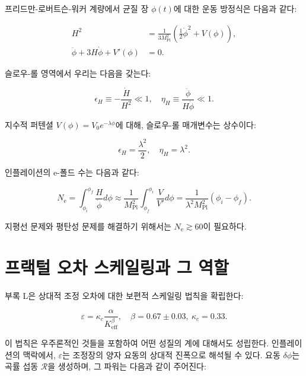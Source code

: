 \documentclass[11pt,a4paper]{article}
\newcommand{\eps}{\varepsilon}
\newcommand{\kappac}{\kappa_c}
\newcommand{\Keff}{K_{\mathrm{eff}}}
\newcommand{\Mpl}{M_{\mathrm{Pl}}}
\newcommand{\ninf}{N_{\mathrm{e}}}
\begin{document}
	프리드만-로버트슨-워커 계량에서 균질 장 \(\phi(t)\)에 대한 운동 방정식은 다음과 같다:
	
	\begin{align}
		H^2 &= \frac{1}{3\Mpl^2} \left( \frac{1}{2}\dot{\phi}^2 + V(\phi) \right), \label{eq:friedman1} \\
		\ddot{\phi} + 3H\dot{\phi} + V'(\phi) &= 0. \label{eq:field}
	\end{align}
	
	슬로우-롤 영역에서 우리는 다음을 갖는다:
	
	\begin{equation}
		\epsilon_H \equiv -\frac{\dot{H}}{H^2} \ll 1, \quad \eta_H \equiv \frac{\ddot{\phi}}{H\dot{\phi}} \ll 1.
	\end{equation}
	
	지수적 퍼텐셜 \(V(\phi) = V_0 e^{-\lambda \phi}\)에 대해, 슬로우-롤 매개변수는 상수이다:
	
	\begin{equation}
		\epsilon_H = \frac{\lambda^2}{2}, \quad \eta_H = \lambda^2.
		\label{eq:slowroll}
	\end{equation}
	
	인플레이션의 e-폴드 수는 다음과 같다:
	
	\begin{equation}
		\ninf = \int_{\phi_i}^{\phi_f} \frac{H}{\dot{\phi}} d\phi \approx \frac{1}{\Mpl^2} \int_{\phi_f}^{\phi_i} \frac{V}{V'} d\phi = \frac{1}{\lambda^2 \Mpl^2} (\phi_i - \phi_f).
	\end{equation}
	
	지평선 문제와 평탄성 문제를 해결하기 위해서는 \(\ninf \gtrsim 60\)이 필요하다.
	
	\section{프랙털 오차 스케일링과 그 역할}
	\label{sec:fractal}
	
	부록 L은 상대적 조정 오차에 대한 보편적 스케일링 법칙을 확립한다:
	
	\begin{equation}
		\eps = \kappac \frac{\alpha}{\Keff^{\beta}}, \quad \beta = 0.67 \pm 0.03,\ \kappac = 0.33.
		\label{eq:error-scaling}
	\end{equation}
	
	이 법칙은 우주론적인 것들을 포함하여 어떤 성질의 계에 대해서도 성립한다. 인플레이션의 맥락에서, \(\eps\)는 조정장의 양자 요동의 상대적 진폭으로 해석될 수 있다. 요동 \(\delta \phi\)는 곡률 섭동 \(\mathcal{R}\)을 생성하며, 그 파워는 다음과 같이 주어진다:
	
\end{document}
